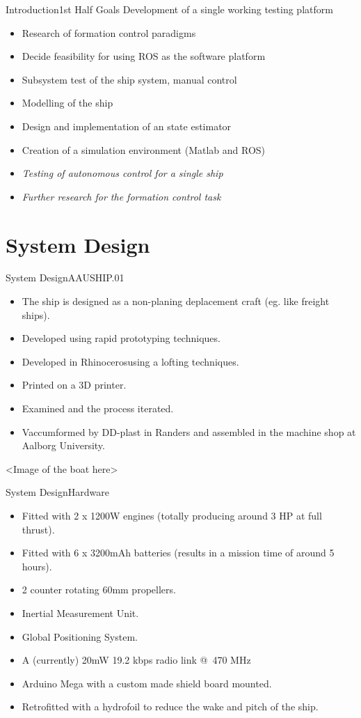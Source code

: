 \documentclass[10pt,handout]{beamer}
\begin{document}
\begin{frame}{Introduction}{1st Half Goals}
Development of a single working testing platform
  \begin{itemize}
  \item Research of formation control paradigms
  \item Decide feasibility for using ROS as the software platform
  \item Subsystem test of the ship system, manual control
  \item Modelling of the ship
  \item Design and implementation of an state estimator
  \item Creation of a simulation environment (Matlab and ROS)
  \item \textit{Testing of autonomous control for a single ship}
  \item \textit{Further research for the formation control task}
  \end{itemize}
\end{frame}


\section{System Design}
\begin{frame}{System Design}{AAUSHIP.01}
\begin{itemize}
  \item<1-> The ship is designed as a non-planing deplacement craft (eg. like freight ships).
  \item<2-> Developed using rapid prototyping techniques.
  \item<3-> Developed in Rhinoceros\texttrademark using a lofting techniques.
  \item<4-> Printed on a 3D printer.
  \item<5-> Examined and the process iterated.
  \item<6-> Vaccumformed by DD-plast in Randers and assembled in the machine shop at Aalborg University.
\end{itemize}
<Image of the boat here>
\end{frame}

\begin{frame}{System Design}{Hardware}
\begin{itemize}
  \item Fitted with 2 x 1200W engines (totally producing around 3 HP at full thrust).
  \item Fitted with 6 x 3200mAh batteries (results in a mission time of around 5 hours).
  \item 2 counter rotating 60mm propellers.
  \item Inertial Measurement Unit.
  \item Global Positioning System.
  \item A (currently) 20mW 19.2 kbps radio link @ 470 MHz
  \item Arduino Mega with a custom made shield board mounted.
  \item Retrofitted with a hydrofoil to reduce the wake and pitch of the ship.
\end{itemize}
\end{frame}
\end{document}

